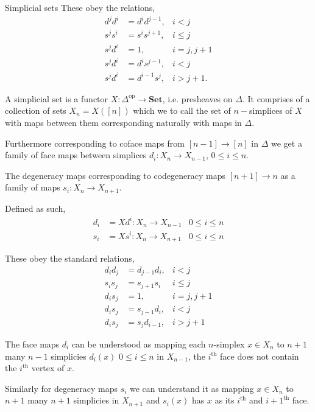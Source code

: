 \documentclass[10pt]{beamer}
\begin{document}
\begin{frame}{Simplicial sets}
	These obey the relations,
	\begin{align*}
		d^j d^i &= d^i d^{j-1}, & i < j \\
		s^j s^i &= s^i s^{j+1}, & i \leq j \\
		s^j d^i &= 1, & i = j, j+1 \\
		s^j d^i &= d^i s^{j-1}, & i < j \\
		s^j d^i &= d^{i-1} s^j, & i > j+1.
	\end{align*}
	
	\begin{definition}
		A simplicial set is a functor $X: \Delta^\mathrm{op} \to \mathbf{Set}$, i.e. presheaves on $\Delta$. It comprises of a collection of sets $X_n =X([n])$ which we to call the set of $n-$simplices of $X$ with maps between them corresponding naturally with maps in $\Delta$.
	\end{definition}
	
	
	
	Furthermore corresponding to coface maps from $[n-1] \to [n]$ in $\Delta$ we get a family of face maps between simplices $d_i:X_n \to X_{n-1}$, $0\leq i \leq n$.
	
	The degeneracy maps corresponding to codegeneracy maps $ [n+1] \to n$ as a family of maps $s_i: X_n \to X_{n+1}$.
	
	Defined as such,
	\begin{align*}
		d_i &= X d^i : X_n \to X_{n-1} & 0 \leq i \leq n \\
		s_i &= X s^i : X_n \to X_{n+1} & 0 \leq i \leq n
	\end{align*}
	
	
	These obey the standard relations,
	\begin{align*}
		d_id_j &= d_{j-1}d_i, &i <j\\
		s_is_j&=s_{j+1}s_i &i \leq j\\
		d_is_j&=1, &i=j,j+1\\
		d_is_j&=s_{j-1}d_i,& i<j\\
		d_is_j&=s_jd_{i-1},& i>j+1
	\end{align*}
	
	The face maps $d_i$ can be understood as mapping each $n$-simplex $x\in X_n$ to $n+1$ many $n-1$ simplicies $d_i(x)$ $0\leq i \leq n$ in $X_{n-1} $, the $i^\mathrm{th}$ face does not contain the $i^{\mathrm{th}}$ vertex of $x$. 
	
	Similarly for degeneracy maps $s_i$ we can understand it as mapping $x \in X_n $ to $n+1$ many $n+1$ simplicies in $X_{n+1} $ and $s_i(x)$ has $x$ as its $i^{\mathrm{th}} $ and $i+1^{\mathrm{th}}$ face. 
	

\end{frame}
\end{document}
